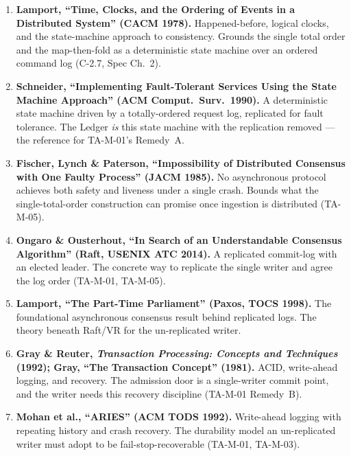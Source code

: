 \documentclass[11pt,a4paper]{article}
\begin{document}
\begin{enumerate}[leftmargin=1.6em,itemsep=2pt]

\item \textbf{Lamport, ``Time, Clocks, and the Ordering of Events in a Distributed System''
(CACM 1978).} Happened-before, logical clocks, and the state-machine approach to consistency.
Grounds the single total order and the map-then-fold as a deterministic state machine over an
ordered command log (C-2.7, Spec Ch.~2).

\item \textbf{Schneider, ``Implementing Fault-Tolerant Services Using the State Machine
Approach'' (ACM Comput.\ Surv.\ 1990).} A deterministic state machine driven by a totally-ordered
request log, replicated for fault tolerance. The Ledger \emph{is} this state machine with the
replication removed --- the reference for TA-M-01's Remedy~A.

\item \textbf{Fischer, Lynch \& Paterson, ``Impossibility of Distributed Consensus with One
Faulty Process'' (JACM 1985).} No asynchronous protocol achieves both safety and liveness under
a single crash. Bounds what the single-total-order construction can promise once ingestion is
distributed (TA-M-05).

\item \textbf{Ongaro \& Ousterhout, ``In Search of an Understandable Consensus Algorithm''
(Raft, USENIX ATC 2014).} A replicated commit-log with an elected leader. The concrete way to
replicate the single writer and agree the log order (TA-M-01, TA-M-05).

\item \textbf{Lamport, ``The Part-Time Parliament'' (Paxos, TOCS 1998).} The foundational
asynchronous consensus result behind replicated logs. The theory beneath Raft/VR for the
un-replicated writer.

\item \textbf{Gray \& Reuter, \emph{Transaction Processing: Concepts and Techniques} (1992);
Gray, ``The Transaction Concept'' (1981).} ACID, write-ahead logging, and recovery. The
admission door is a single-writer commit point, and the writer needs this recovery discipline
(TA-M-01 Remedy~B).

\item \textbf{Mohan et al., ``ARIES'' (ACM TODS 1992).} Write-ahead logging with repeating
history and crash recovery. The durability model an un-replicated writer must adopt to be
fail-stop-recoverable (TA-M-01, TA-M-03).


\end{enumerate}
\end{document}
